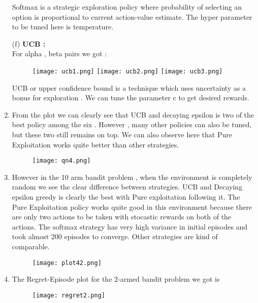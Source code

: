 \documentclass[a4 paper]{article}
\begin{document}
\begin{enumerate}
Softmax is a strategic exploration policy where probability of selecting an option is proportional to current action-value estimate. The hyper parameter to be tuned here is temperature.

(f) \textbf{ UCB :} \\
For alpha , beta pairs  we got : 
\begin{figure}[h!]
    \centering
    \texttt{[image: ucb1.png]}
    \texttt{[image: ucb2.png]}
    \texttt{[image: ucb3.png]}
\end{figure}

UCB or upper confidence bound is a technique which uses uncertainty as a bonus for exploration . We can tune the parameter c to get desired rewards.

\item From the plot we can clearly see that UCB and decaying epsilon is two of the best policy among the six . However , many other policies can also be tuned, but these two still remains on top. We can also observe here that Pure Exploitation works quite better than other strategies.

\begin{figure}[h!]
    \centering
    \texttt{[image: qn4.png]}
\end{figure}

\item However in the 10 arm bandit problem , when the environment is completely random we see the clear difference between strategies. UCB and Decaying epsilon greedy is clearly the best with Pure exploitation following it. The Pure Exploitation policy works quite good in this environment because there are only two actions to be taken with stocastic rewards on both of the actions. The softmax strategy has very high variance in initial episodes and took almost 200 episodes to converge. Other strategies are kind of comparable.

\begin{figure}[h!]
    \centering
    \texttt{[image: plot42.png]}
\end{figure}


\item The Regret-Episode plot for the 2-armed bandit problem we got is 

\begin{figure}[h!]
    \centering
    \texttt{[image: regret2.png]}
\end{figure}


\end{enumerate}
\end{document}

